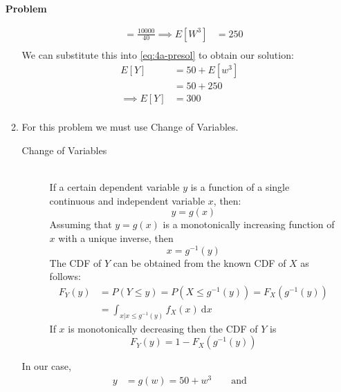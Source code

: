 \documentclass[12pt]{article}
\newenvironment{Ex}{\textbf{Problem}\vspace{.75em}\\}{}
\newcommand{\dd}[1]{\:\mathrm{d}{#1}}
\begin{document}
\begin{enumerate}
\begin{Ex}
\begin{solution}
\begin{enumerate}
\begin{equation}
\begin{aligned}
            &= \frac{10000}{40}
            \implies E[W^3] &= 250 \\
          \end{aligned}
        \end{equation}
        We can substitute this into \cref{eq:4a-presol} to obtain our
        solution:
        \begin{equation}
          \label{eq:4a-sol}
          \begin{aligned}
            E[Y] &= 50 + E[w^3] \\
            &= 50 + 250 \\
            \implies E[Y] &= 300 \\
          \end{aligned}
        \end{equation}
      \item For this problem we must use Change of Variables.
        \begin{mdframed}[backgroundcolor=silver]
        \begin{description}
        \item[Change of Variables] \hfill \vspace{.75em} \\
          If a certain dependent variable $y$ is a function of a
          single continuous and independent variable $x$, then:
          $$y = g(x)$$
          Assuming that $y=g(x)$ is a monotonically increasing
          function of $x$ with a unique inverse, then
          $$x=g^{-1}(y)$$
          The CDF of $Y$ can be obtained from the known CDF of $X$ as
          follows:
          \begin{equation*}
            \begin{aligned}
              F_Y(y) &= P(Y\le y) = P(X \le g^{-1}(y)) =
              F_X(g^{-1}(y)) \\
              &= \int_{x|x\le g^{-1}(y)} f_X(x) \dd{x}
            \end{aligned}
          \end{equation*}
          If $x$ is monotonically decreasing then the CDF of $Y$ is
          $$F_Y(y) = 1 - F_X(g^{-1}(y))$$
        \end{description}
      \end{mdframed}
      In our case,
        \begin{equation}
          \label{eq:4b-setup}
          \begin{aligned}
            y &= g(w) = 50 + w^3  \quad\quad\text{and} \\

\end{aligned}
\end{equation}
\end{enumerate}
\end{solution}
\end{Ex}
\end{enumerate}
\end{document}

